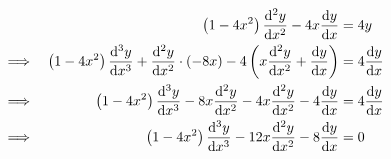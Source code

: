 \documentclass{echw}
\begin{document}
        \begin{alignat*}{2}
            && \left(1-4x^2\right)\derm{y}{x}2 -4x \der{y}{x} &= 4y\\
            \implies&&\left(1 - 4x^2\right) \derm{y}{x}3 + \derm{y}{x}2 \cdot (-8x) - 4\left(x  \derm{y}{x}2 + \der{y}{x} \right) &= 4\der{y}{x}\\
            \implies&&\left(1 - 4x^2\right) \derm{y}{x}3 -8x \derm{y}{x}2 - 4x  \derm{y}{x}2 - 4\der{y}{x} &= 4\der{y}{x}\\
            \implies&&\left(1 - 4x^2\right) \derm{y}{x}3 -12x \derm{y}{x}2 - 8\der{y}{x} &= 0
        \end{alignat*}

\end{document}
